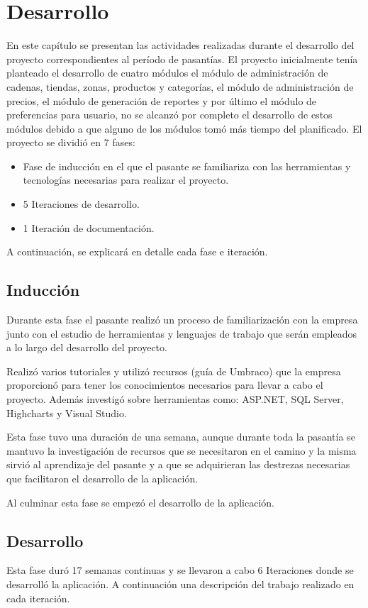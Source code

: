 \chapter{Desarrollo} \label{development}
En este capítulo se presentan las actividades realizadas durante el desarrollo del proyecto correspondientes al período de pasantías. El proyecto inicialmente tenía planteado el desarrollo de cuatro módulos el módulo de administración de cadenas, tiendas, zonas, productos y categorías, el módulo de administración de precios, el módulo de generación de reportes y por último el módulo de preferencias para usuario, no se alcanzó por completo el desarrollo de estos módulos debido a que alguno de los módulos tomó más tiempo del planificado. 
El proyecto se dividió en 7 fases:
\begin{itemize}
   \item Fase de inducción en el que el pasante se familiariza con las herramientas y tecnologías necesarias para realizar el proyecto.
   \item 5 Iteraciones de desarrollo.
   \item 1 Iteración de documentación.
\end{itemize}
A continuación, se explicará en detalle cada fase e iteración.

\section{Inducción}
Durante esta fase el pasante realizó un proceso de familiarización con la empresa junto con el estudio de herramientas y lenguajes de trabajo que serán empleados a lo largo del desarrollo del proyecto.

Realizó varios tutoriales y utilizó recursos (guía de Umbraco) que la empresa proporcionó para tener los conocimientos necesarios para llevar a cabo el proyecto. Además investigó sobre herramientas como: ASP.NET, SQL Server, Highcharts y Visual Studio. 

Esta fase tuvo una duración de una semana, aunque durante toda la pasantía se mantuvo la investigación de recursos que se necesitaron en el camino y la misma sirvió al aprendizaje del pasante y a que se adquirieran las destrezas necesarias que facilitaron el desarrollo de la aplicación.

Al culminar esta fase se empezó el desarrollo de la aplicación.

\section{Desarrollo}
Esta fase duró 17 semanas continuas y se llevaron a cabo 6 Iteraciones donde se desarrolló la aplicación. A continuación una descripción del trabajo realizado en cada iteración.

